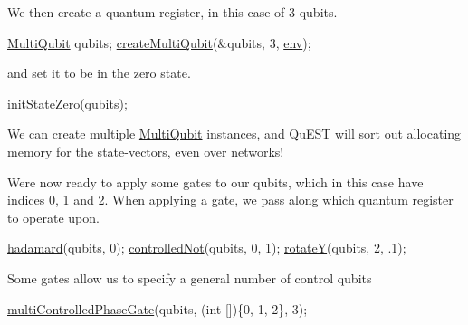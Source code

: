 We then create a quantum register, in this case of 3 qubits. 
\begin{DoxyCode}
\mbox{\hyperlink{structMultiQubit}{MultiQubit}} qubits; 
\mbox{\hyperlink{QuEST_8c_a9c02591bc64c2918503afa231d90d83f}{createMultiQubit}}(&qubits, 3, \mbox{\hyperlink{runTests_8c_a5fd8ba97fcae3408ae6221dfc3cc1f93}{env}});
\end{DoxyCode}
 and set it to be in the zero state. 
\begin{DoxyCode}
\mbox{\hyperlink{QuEST_8c_a9ba8171c9ec5c42202b144026527e9ec}{initStateZero}}(qubits);
\end{DoxyCode}
 We can create multiple {\ttfamily \mbox{\hyperlink{structMultiQubit}{Multi\+Qubit}}} instances, and Qu\+E\+ST will sort out allocating memory for the state-\/vectors, even over networks!

We\textquotesingle{}re now ready to apply some gates to our qubits, which in this case have indices 0, 1 and 2. When applying a gate, we pass along which quantum register to operate upon. 
\begin{DoxyCode}
\mbox{\hyperlink{QuEST__env__local_8c_aa09b5dd93de6df1384b8f2c0041749ab}{hadamard}}(qubits, 0);
\mbox{\hyperlink{QuEST__env__local_8c_a67576895bbc65463481a8ea24d9b1e22}{controlledNot}}(qubits, 0, 1);
\mbox{\hyperlink{QuEST_8c_ace0d3592d38a990e81a434c4e9681500}{rotateY}}(qubits, 2, .1);
\end{DoxyCode}


Some gates allow us to specify a general number of control qubits 
\begin{DoxyCode}
\mbox{\hyperlink{QuEST_8c_afc1835c6b43b6e59ce7df7b13f274fc7}{multiControlledPhaseGate}}(qubits, (\textcolor{keywordtype}{int} [])\{0, 1, 2\}, 3);
\end{DoxyCode}


